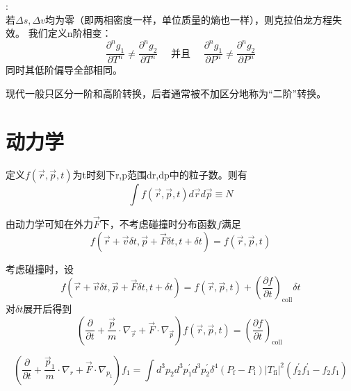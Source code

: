 \documentclass[12pt, a4paper, oneside]{ctexbook}
\newcommand{\hl}[1]{\hlbox{#1}}
\newcounter{#2}
\newcounter{#2}[#1]
\numberwithin{#2}{#1}
\begin{document}
          \begin{define}
            \hl{n阶相变}:\\
            若\(\Delta s,\Delta v\)均为零（即两相密度一样，单位质量的熵也一样），则克拉伯龙方程失效。
            我们定义n阶相变：
            \begin{equation}
              \frac{\partial^n g_1}{\partial T^n} \neq \frac{\partial^n g_2}{\partial T^n} \quad \text { 并且 } \quad \frac{\partial^n g_1}{\partial P^n} \neq \frac{\partial^n g_2}{\partial P^n}
            \end{equation}
            同时其低阶偏导全部相同。

            现代一般只区分一阶和高阶转换，后者通常被不加区分地称为“二阶”转换。
          \end{define}
          \chapter{动力学}
          \begin{define}
            定义\(f(\vec r,\vec p,t)\)为t时刻下r,p范围dr,dp中的粒子数。则有
            \begin{equation}
              \int f(\vec r,\vec p,t)d\vec rd\vec p\equiv N
            \end{equation}
          \end{define}
          \begin{deduce}
            由动力学可知在外力\(\vec F\)下，不考虑碰撞时分布函数\(f\)满足
            \begin{equation}
              f(\vec r+\vec v\delta t,\vec p+\vec F\delta t,t+\delta t)=f(\vec r,\vec p,t)
            \end{equation}
          \end{deduce}
          \begin{deduce}
            考虑碰撞时，设
            \begin{equation}
              f(\vec{r}+\vec{v} \delta t, \vec{p}+\vec{F} \delta t, t+\delta t)=f(\vec{r}, \vec{p}, t)+\left(\frac{\partial f}{\partial t}\right)_{\mathrm{coll}} \delta t
            \end{equation}
            对\(\delta t\)展开后得到
            \begin{equation}
              \left(\frac{\partial}{\partial t}+\frac{\vec{p}}{m} \cdot \nabla_{\vec{r}}+\vec{F} \cdot \nabla_{\vec{p}}\right) f(\vec{r}, \vec{p}, t)=\left(\frac{\partial f}{\partial t}\right)_{\text {coll }}
            \end{equation}
          \end{deduce}
          \begin{deduce}
            \hl{玻耳兹曼输运方程}
            \begin{equation}
              \left(\frac{\partial}{\partial t}+\frac{\vec{p}_1}{m} \cdot \nabla_r+\vec{F} \cdot \nabla_{p_1}\right) f_1=\int d^3 p_2 d^3 p_1^{\prime} d^3 p_2^{\prime} \delta^4\left(P_{\mathrm{f}}-P_{\mathrm{i}}\right)\left|T_{\mathrm{fi}}\right|^2\left(f_2^{\prime} f_1^{\prime}-f_2 f_1\right)
            \end{equation}
          \end{deduce}
\end{document}

